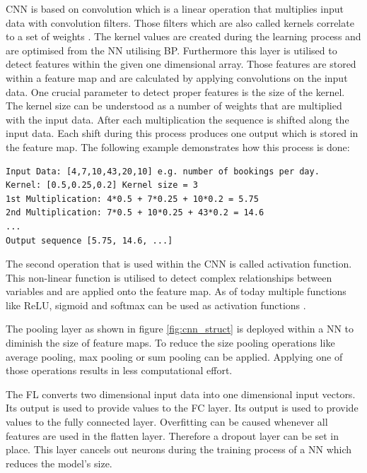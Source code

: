 CNN is based on convolution which is a linear operation that multiplies input data with convolution filters. Those filters which are also called kernels correlate to a set of weights \cite{cnn_vechicle}. The kernel values are created during the learning process and are optimised from the NN utilising BP. Furthermore this layer is utilised to detect features within the given one dimensional array. Those features are stored within a feature map and are calculated by applying convolutions on the input data. One crucial parameter to detect proper features is the size of the kernel. The kernel size can be understood as a number of weights that are multiplied with the input data. After each multiplication the sequence is shifted along the input data. Each shift during this process produces one output which is stored in the feature map. The following example demonstrates how this process is done:\cite{1d_cnn}
\begin{lstlisting}
Input Data: [4,7,10,43,20,10] e.g. number of bookings per day. 
Kernel: [0.5,0.25,0.2] Kernel size = 3
1st Multiplication: 4*0.5 + 7*0.25 + 10*0.2 = 5.75
2nd Multiplication: 7*0.5 + 10*0.25 + 43*0.2 = 14.6
...
Output sequence [5.75, 14.6, ...]
\end{lstlisting}
The second operation that is used within the CNN is called activation function. This non-linear function is utilised to detect complex relationships between variables and are applied onto the feature map. As of today multiple functions like ReLU, sigmoid and softmax can be used as activation functions \cite{cnn_basic3}.

The pooling layer as shown in figure \ref{fig:cnn_struct} is deployed within a NN to diminish the size of feature maps. To reduce the size pooling operations like average pooling, max pooling or sum pooling can be applied. Applying one of those operations results in less computational effort.\cite{cnn_basic}


The FL converts two dimensional input data into one dimensional input vectors. Its output is used to provide values to the FC layer. Its output is used to provide values to the fully connected layer. Overfitting can be caused whenever all features are used in the flatten layer. Therefore a dropout layer can be set in place.\cite{1d_cnn} This layer cancels out neurons during the training process of a NN which reduces the model's size. 

